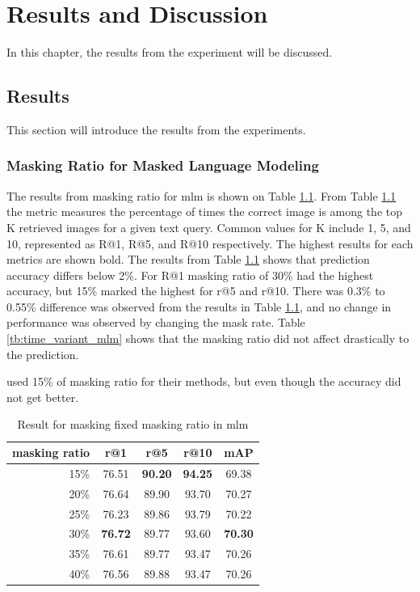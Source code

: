 

\chapter{Results and Discussion}
In this chapter, the results from the experiment will be discussed.

\section{Results}
This section will introduce the results from the experiments.

\subsection{Masking Ratio for Masked Language Modeling}
The results from masking ratio for \acrshort{mlm} is shown on Table \ref{tb:fixed_mlm}. From Table \ref{tb:fixed_mlm} the metric measures the percentage of times the correct image is among the top K retrieved images for a given text query. Common values for K include 1, 5, and 10, represented as R@1, R@5, and R@10 respectively. The highest results for each metrics are shown bold.
The results from Table \ref{tb:fixed_mlm} shows that prediction accuracy differs below 2\%. For R@1 masking ratio of 30\% had the highest accuracy, but 15\% marked the highest for r@5 and r@10. There was 0.3\% to 0.55\% difference was observed from the results in Table \ref{tb:fixed_mlm}, and no change in performance was observed by changing the mask rate.
Table \ref{tb:time_variant_mlm} shows that the masking ratio did not affect drastically to the prediction. 

\cite{Bai2023RaSaRA} used 15\% of masking ratio for their methods, but even though the accuracy did not get better.

\begin{table}[htbp]
    \centering
    \caption{Result for masking fixed masking ratio in \acrshort{mlm}}
    \label{tb:fixed_mlm}
    
    \begin{tabular}{rcccc}
      masking ratio & r@1 & r@5 & r@10 & mAP\\ \hline
      15\% & 76.51 & \textbf{90.20} & \textbf{94.25} & 69.38 \\
      20\% & 76.64 & 89.90 & 93.70 & 70.27 \\
      25\% & 76.23 & 89.86 & 93.79 & 70.22 \\
      30\% & \textbf{76.72} & 89.77 & 93.60 & \textbf{70.30} \\
      35\% & 76.61 & 89.77 & 93.47 & 70.26 \\
      40\% & 76.56 & 89.88 & 93.47 & 70.26
    \end{tabular}
\end{table}

